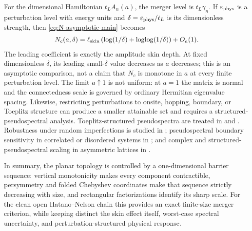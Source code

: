 \documentclass[review,hidelinks,onefignum,onetabnum]{siamart251216}
\begin{document}
For the dimensional Hamiltonian \(t_LA_n(a)\), the merger level is
\(t_L\gamma_n\).  If \(\varepsilon_{\rm phys}\) is a perturbation
level with energy units and
\(\delta=\varepsilon_{\rm phys}/t_L\) is its dimensionless strength,
then \eqref{eq:N-asymptotic-main} becomes
\[
 N_c(a,\delta)=\ell_{\rm skin}
 \left(\log(1/\delta)+\log\!\log(1/\delta)\right)+O_a(1).
\]
The leading coefficient is exactly the amplitude skin depth.  At fixed
dimensionless \(\delta\), its leading small-\(\delta\) value decreases as
\(a\) decreases; this is an asymptotic comparison, not a claim that
\(N_c\) is monotone in \(a\) at every finite perturbation level.  The
limit \(a\uparrow1\)
is not uniform: at \(a=1\) the matrix is normal and the connectedness
scale is governed by ordinary Hermitian eigenvalue spacing.  Likewise,
restricting perturbations to onsite, hopping, boundary, or Toeplitz
structure can produce a smaller attainable set and requires a
structured-pseudospectral analysis.  Toeplitz-structured
pseudospectra are treated in \cite{BottcherGrudsky2005} and
\cite{ButtaGuglielmiNoschese2012}.  Robustness under random imperfections
is studied in \cite{AmmariEtAl2024Stability}; pseudospectral boundary
sensitivity in correlated or disordered systems in
\cite{OkumaSato2021}; and complex and structured-pseudospectral scaling
in asymmetric lattices in \cite{KiorpelidisMakris2025}.

In summary, the planar topology is controlled by a one-dimensional
barrier sequence: vertical monotonicity makes every component
contractible, persymmetry and folded Chebyshev coordinates make that
sequence strictly decreasing with size, and rectangular factorizations
identify its sharp scale.  For the clean open Hatano--Nelson chain this
provides an exact finite-size merger criterion, while keeping distinct
the skin effect itself, worst-case spectral uncertainty, and
perturbation-structured physical response.



\end{document}
